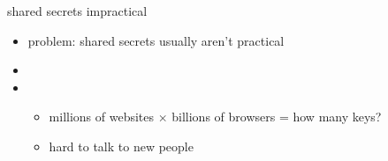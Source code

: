 \begin{frame}[fragile,label=sharedSecretProblem]{shared secrets impractical}
    \begin{itemize}
    \item problem: shared secrets usually aren't practical
    \vspace{.5cm}
    \item {}
    \item {}
        \begin{itemize}
        \item millions of websites $\times$ billions of browsers = how many keys?
        \item hard to talk to new people
        \end{itemize}
    \end{itemize}
\end{frame}



